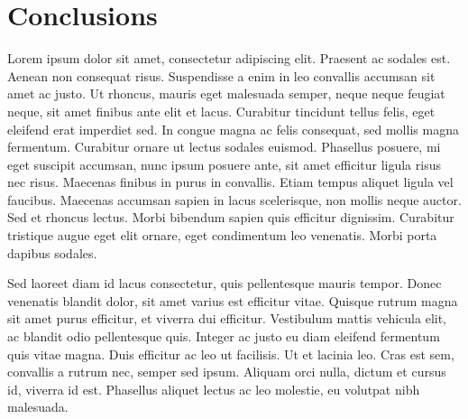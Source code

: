 \chapter{Conclusions} \label{ch:5}

Lorem ipsum dolor sit amet, consectetur adipiscing elit. Praesent ac sodales est. Aenean non consequat risus. Suspendisse a enim in leo convallis accumsan sit amet ac justo. Ut rhoncus, mauris eget malesuada semper, neque neque feugiat neque, sit amet finibus ante elit et lacus. Curabitur tincidunt tellus felis, eget eleifend erat imperdiet sed. In congue magna ac felis consequat, sed mollis magna fermentum. Curabitur ornare ut lectus sodales euismod. Phasellus posuere, mi eget suscipit accumsan, nunc ipsum posuere ante, sit amet efficitur ligula risus nec risus. Maecenas finibus in purus in convallis. Etiam tempus aliquet ligula vel faucibus. Maecenas accumsan sapien in lacus scelerisque, non mollis neque auctor. Sed et rhoncus lectus. Morbi bibendum sapien quis efficitur dignissim. Curabitur tristique augue eget elit ornare, eget condimentum leo venenatis. Morbi porta dapibus sodales.

Sed laoreet diam id lacus consectetur, quis pellentesque mauris tempor. Donec venenatis blandit dolor, sit amet varius est efficitur vitae. Quisque rutrum magna sit amet purus efficitur, et viverra dui efficitur. Vestibulum mattis vehicula elit, ac blandit odio pellentesque quis. Integer ac justo eu diam eleifend fermentum quis vitae magna. Duis efficitur ac leo ut facilisis. Ut et lacinia leo. Cras est sem, convallis a rutrum nec, semper sed ipsum. Aliquam orci nulla, dictum et cursus id, viverra id est. Phasellus aliquet lectus ac leo molestie, eu volutpat nibh malesuada. 